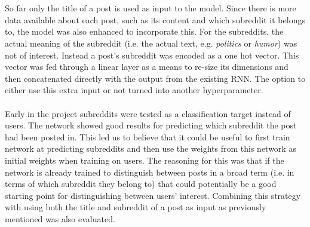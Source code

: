 \\\\
So far only the title of a post is used as input to the model. Since there is more data available about each post, such as its content and which subreddit it belongs to, the model was also enhanced to incorporate this. For the subreddits, the actual meaning of the subreddit (i.e. the actual text, e.g. \textit{politics} or \textit{humor}) was not of interest. Instead a post's subreddit was encoded as a one hot vector. This vector was fed through a linear layer as a means to re-size its dimensions and then concatenated directly with the output from the existing RNN. The option to either use this extra input or not turned into another hyperparameter.
\\\\
Early in the project subreddits were tested as a classification target instead of users. The network showed good results for predicting which subreddit the post had been posted in. This led us to believe that it could be useful to first train network at predicting subreddits and then use the weights from this network as initial weights when training on users. The reasoning for this was that if the network is already trained to distinguish between posts in a broad term (i.e. in terms of which subreddit they belong to) that could potentially be a good starting point for distinguishing between users' interest. Combining this strategy with using both the title and subreddit of a post as input as previously mentioned was also evaluated.

